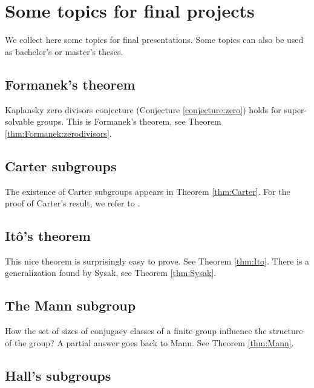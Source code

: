 \section*{Some topics for final projects}

\fancyhf{}
\fancyfoot[R]{\thepage}
\fancyhead[L]{\course}
\setlength{\headheight}{14pt}

We collect here some topics for final presentations. Some topics
can also be used as bachelor's or master's theses.

\subsection*{Formanek's theorem}

Kaplansky zero divisors conjecture (Conjecture \ref{conjecture:zero}) 
holds for super-solvable groups. 
This is Formanek's theorem, see Theorem \ref{thm:Formanek:zerodivisors}. 

\subsection*{Carter subgroups}

The existence of Carter subgroups appears in Theorem \ref{thm:Carter}. For the proof of Carter's result, we refer to \cite{MR0123603}.

\subsection*{It\^o's theorem}

This nice theorem is surprisingly easy to prove. See Theorem \ref{thm:Ito}. There is a generalization
found by Sysak, see Theorem \ref{thm:Sysak}. 

\subsection*{The Mann subgroup}

How the set of sizes of conjugacy classes of a finite group influence 
the structure of the group? A partial answer goes back to Mann. See Theorem \ref{thm:Mann}. 


\subsection*{Hall's subgroups}

